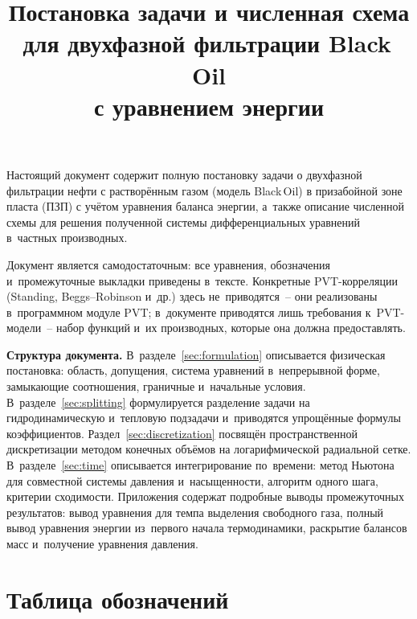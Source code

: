 \documentclass[12pt,a4paper]{article}
\title{Постановка задачи и численная схема\\
для двухфазной фильтрации Black\,Oil\\
с уравнением энергии}
\author{}
\date{}
\begin{document}
\maketitle
\tableofcontents
\newpage


Настоящий документ содержит полную постановку задачи о двухфазной
фильтрации нефти с растворённым газом (модель Black\,Oil) в призабойной
зоне пласта (ПЗП) с учётом уравнения баланса энергии, а~также описание
численной схемы для решения полученной системы дифференциальных уравнений
в~частных производных.

Документ является самодостаточным: все уравнения, обозначения и~промежуточные
выкладки приведены в~тексте. Конкретные PVT-корреляции (Standing, Beggs--Robinson
и~др.) здесь не~приводятся~-- они реализованы в~программном модуле PVT;
в~документе приводятся лишь требования к~PVT-модели~-- набор функций и~их производных,
которые она должна предоставлять.

\textbf{Структура документа.}
В~разделе~\ref{sec:formulation} описывается физическая постановка: область,
допущения, система уравнений в~непрерывной форме, замыкающие соотношения,
граничные и~начальные условия.
В~разделе~\ref{sec:splitting} формулируется разделение задачи на
гидродинамическую и~тепловую подзадачи и~приводятся упрощённые формулы
коэффициентов.
Раздел~\ref{sec:discretization} посвящён пространственной дискретизации
методом конечных объёмов на логарифмической радиальной сетке.
В~разделе~\ref{sec:time} описывается интегрирование по~времени: метод
Ньютона для совместной системы давления и~насыщенности, алгоритм одного
шага, критерии сходимости.
Приложения содержат подробные выводы промежуточных результатов:
вывод уравнения для темпа выделения свободного газа,
полный вывод уравнения энергии из~первого начала термодинамики,
раскрытие балансов масс и~получение уравнения давления.


\newpage
\section*{Таблица обозначений}
\end{document}
